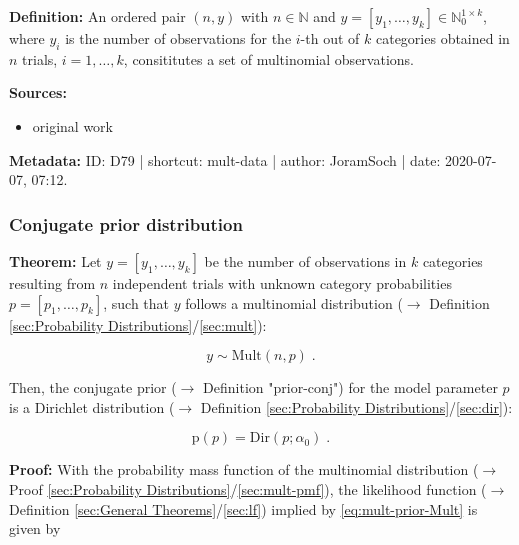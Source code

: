 \documentclass[a4paper,12pt,twoside]{book}
\begin{document}
\textbf{Definition:} An ordered pair $(n,y)$ with $n \in \mathbb{N}$ and $y = \left[ y_1, \ldots, y_k \right] \in \mathbb{N}_0^{1 \times k}$, where $y_i$ is the number of observations for the $i$-th out of $k$ categories obtained in $n$ trials, $i = 1, \ldots, k$, consititutes a set of multinomial observations.


\vspace{1em}
\textbf{Sources:}
\begin{itemize}
\item original work\end{itemize}


\vspace{1em}
\textbf{Metadata:} ID: D79 | shortcut: mult-data | author: JoramSoch | date: 2020-07-07, 07:12.
\vspace{1em}



\subsubsection[\textbf{Conjugate prior distribution}]{Conjugate prior distribution} \label{sec:mult-prior}
\setcounter{equation}{0}

\textbf{Theorem:} Let $y = [y_1, \ldots, y_k]$ be the number of observations in $k$ categories resulting from $n$ independent trials with unknown category probabilities $p = [p_1, \ldots, p_k]$, such that $y$ follows a multinomial distribution ($\rightarrow$ Definition \ref{sec:Probability Distributions}/\ref{sec:mult}):

\begin{equation} \label{eq:mult-prior-Mult}
y \sim \mathrm{Mult}(n,p) \; .
\end{equation}

Then, the conjugate prior ($\rightarrow$ Definition "prior-conj") for the model parameter $p$ is a Dirichlet distribution ($\rightarrow$ Definition \ref{sec:Probability Distributions}/\ref{sec:dir}):

\begin{equation} \label{eq:mult-prior-Dir}
\mathrm{p}(p) = \mathrm{Dir}(p; \alpha_0) \; .
\end{equation}


\vspace{1em}
\textbf{Proof:} With the probability mass function of the multinomial distribution ($\rightarrow$ Proof \ref{sec:Probability Distributions}/\ref{sec:mult-pmf}), the likelihood function ($\rightarrow$ Definition \ref{sec:General Theorems}/\ref{sec:lf}) implied by \eqref{eq:mult-prior-Mult} is given by
\end{document}
